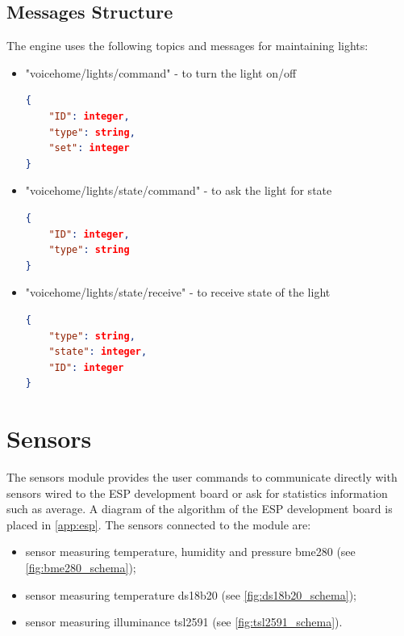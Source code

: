 \subsection{Messages Structure}

The engine uses the following topics and messages for maintaining lights:

\begin{itemize}
    \item "voicehome/lights/command" - to turn the light on/off
    \begin{lstlisting}[language=json,firstnumber=1,caption={Structure of JSON message to turn on/off the light in module \textit{Lights}},captionpos=b,xleftmargin=1cm]
{
    "ID": integer,
    "type": string,
    "set": integer
}
    \end{lstlisting}
    \item "voicehome/lights/state/command" - to ask the light for state
    \begin{lstlisting}[language=json,firstnumber=1,caption={Structure of JSON message to asking for the state of the light in module \textit{Lights}},captionpos=b,xleftmargin=1cm]
{
    "ID": integer,
    "type": string
}
    \end{lstlisting}
    \item "voicehome/lights/state/receive" - to receive state of the light
    \begin{lstlisting}[language=json,firstnumber=1,caption={Structure of JSON message to receive state of the light in module \textit{Lights}},captionpos=b,xleftmargin=1cm]
{
    "type": string,
    "state": integer,
    "ID": integer
}
    \end{lstlisting}
\end{itemize}

\section{Sensors}

The sensors module provides the user commands to communicate directly with sensors wired to the ESP development board or ask for statistics information such as average. A diagram of the algorithm of the ESP development board is placed in \cref{app:esp}. The sensors connected to the module are:
\begin{itemize}
    \item sensor measuring temperature, humidity and pressure bme280 (see \cref{fig:bme280_schema});
    \item sensor measuring temperature ds18b20 (see \cref{fig:ds18b20_schema});
    \item sensor measuring illuminance tsl2591 (see \cref{fig:tsl2591_schema}).
\end{itemize}

